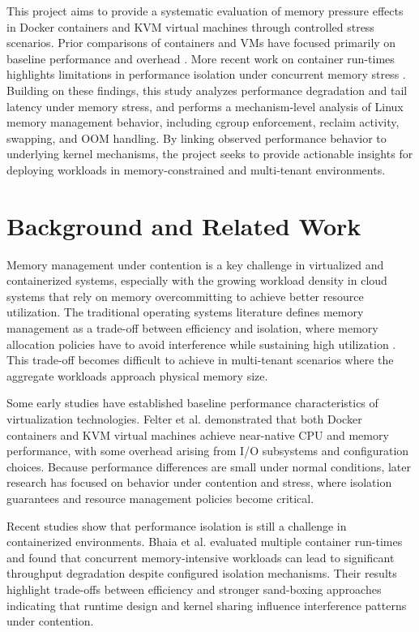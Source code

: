 \documentclass[conference]{IEEEtran}
\begin{document}
This project aims to provide a systematic evaluation of memory pressure effects in Docker containers and KVM virtual machines through controlled stress scenarios. Prior comparisons of containers and VMs have focused primarily on baseline performance and overhead \cite{felter2015comparison}. More recent work on container run-times highlights limitations in performance isolation under concurrent memory stress \cite{bhaia2024isolation}. Building on these findings, this study analyzes performance degradation and tail latency under memory stress, and performs a mechanism-level analysis of Linux memory management behavior, including cgroup enforcement, reclaim activity, swapping, and OOM handling. By linking observed performance behavior to underlying kernel mechanisms, the project seeks to provide actionable insights for deploying workloads in memory-constrained and multi-tenant environments.




\section{Background and Related Work}
Memory management under contention is a key challenge in virtualized and containerized systems, especially with the growing workload density in cloud systems that rely on memory overcommitting to achieve better resource utilization. The traditional operating systems literature defines memory management as a trade-off between efficiency and isolation, where memory allocation policies have to avoid interference while sustaining high utilization \cite{silberschatz2018operating}. This trade-off becomes difficult to achieve in multi-tenant scenarios where the aggregate workloads approach physical memory size.

Some early studies have established baseline performance characteristics of virtualization technologies. Felter et al. \cite{felter2015comparison} demonstrated that both Docker containers and KVM virtual machines achieve near-native CPU and memory performance, with some overhead arising from I/O subsystems and configuration choices. Because performance differences are small under normal conditions, later research has focused on behavior under contention and stress, where isolation guarantees and resource management policies become critical.

Recent studies show that performance isolation is still a challenge in containerized environments. Bhaia et al. \cite{bhaia2024isolation} evaluated multiple container run-times and found that concurrent memory-intensive workloads can lead to significant throughput degradation despite configured isolation mechanisms. Their results highlight trade-offs between efficiency and stronger sand-boxing approaches indicating that runtime design and kernel sharing influence interference patterns under contention.
\end{document}
